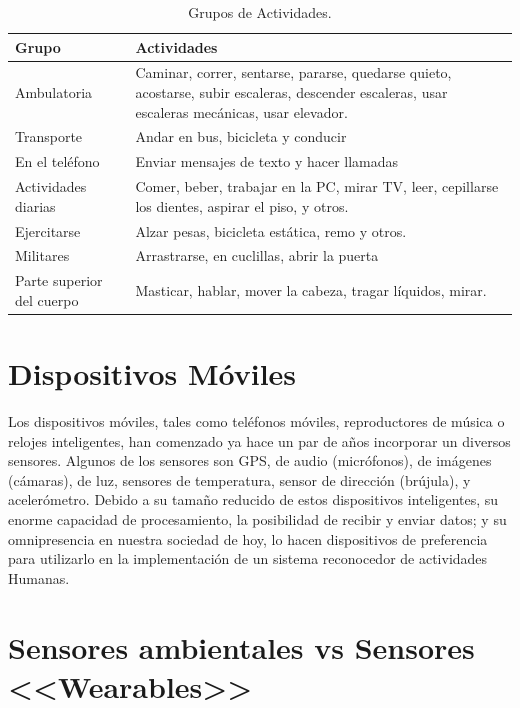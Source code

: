 \begin{table}[htbp]
	\begin{center}
		\begin{tabular}{|l|p{9cm}|}
			\hline
			\textbf{Grupo} & \textbf{Actividades} \\
			\hline \hline
			Ambulatoria & Caminar, correr, sentarse, pararse, quedarse quieto, acostarse, subir escaleras, descender escaleras, usar escaleras mecánicas, usar elevador.\\ \hline
			Transporte & Andar en bus, bicicleta y conducir \\ \hline
			En el teléfono & Enviar mensajes de texto y hacer llamadas \\ \hline
			Actividades diarias & Comer, beber, trabajar en la PC, mirar TV, leer, cepillarse los dientes, aspirar el piso, y otros. \\ \hline
			Ejercitarse & Alzar pesas, bicicleta estática, remo y otros. \\ \hline
			Militares & Arrastrarse, en cuclillas, abrir la puerta \\ \hline
			Parte superior del cuerpo & Masticar, hablar, mover la cabeza, tragar líquidos, mirar. \\ \hline
		\end{tabular}
		\caption{Grupos de Actividades.}
		\label{tabla:sencilla}
	\end{center}
\end{table}


\section{Dispositivos Móviles}
Los dispositivos móviles, tales como teléfonos móviles, reproductores de música o relojes inteligentes, han comenzado ya hace un par de años incorporar un diversos sensores. Algunos de los sensores son GPS, de audio (micrófonos), de imágenes (cámaras), de luz, sensores de temperatura, sensor de dirección (brújula), y acelerómetro.
Debido a su tamaño reducido de estos dispositivos inteligentes, su enorme capacidad de procesamiento, la posibilidad de recibir y enviar datos; y su omnipresencia en nuestra sociedad de hoy, lo hacen dispositivos de preferencia para utilizarlo en la implementación de un sistema reconocedor de actividades Humanas.

\section{Sensores ambientales vs Sensores <<Wearables>>}

